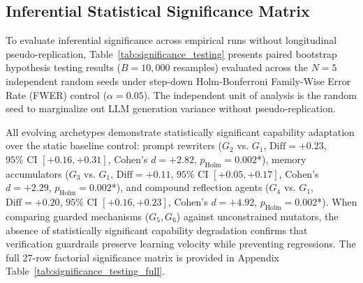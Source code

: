 \documentclass[conference]{IEEEtran}
\begin{document}
\subsection{Inferential Statistical Significance Matrix}
\label{sec:significance}
To evaluate inferential significance across empirical runs without longitudinal pseudo-replication, Table~\ref{tab:significance_testing} presents paired bootstrap hypothesis testing results ($B = 10{,}000$ resamples) evaluated across the $N = 5$ independent random seeds under step-down Holm-Bonferroni Family-Wise Error Rate (FWER) control ($\alpha = 0.05$). The independent unit of analysis is the random seed to marginalize out LLM generation variance without pseudo-replication.

All evolving archetypes demonstrate statistically significant capability adaptation over the static baseline control: prompt rewriters ($G_2$ vs. $G_1$, $\text{Diff} = +0.23$, $95\%\text{ CI } [+0.16, +0.31]$, Cohen's $d = +2.82$, $p_{\text{Holm}} = 0.002$*), memory accumulators ($G_3$ vs. $G_1$, $\text{Diff} = +0.11$, $95\%\text{ CI } [+0.05, +0.17]$, Cohen's $d = +2.29$, $p_{\text{Holm}} = 0.002$*), and compound reflection agents ($G_4$ vs. $G_1$, $\text{Diff} = +0.20$, $95\%\text{ CI } [+0.16, +0.23]$, Cohen's $d = +4.92$, $p_{\text{Holm}} = 0.002$*). When comparing guarded mechanisms ($G_5, G_6$) against unconstrained mutators, the absence of statistically significant capability degradation confirms that verification guardrails preserve learning velocity while preventing regressions. The full 27-row factorial significance matrix is provided in Appendix Table~\ref{tab:significance_testing_full}.


\end{document}
